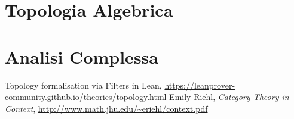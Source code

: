 \documentclass[a4paper, twoside]{book}
\begin{document}






\part{Topologia Algebrica}






\part{Analisi Complessa}



















\appendix
%


\begin{thebibliography}{9}
		Topology formalisation via Filters in Lean,
		\url{https://leanprover-community.github.io/theories/topology.html}
		Emily Riehl,
		\textit{Category Theory in Context},
		\url{http://www.math.jhu.edu/~eriehl/context.pdf}
\end{thebibliography}
\end{document}
